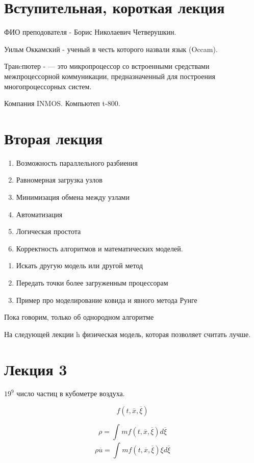 \documentclass{article}
\begin{document}
\section{Вступительная, короткая лекция}

ФИО преподователя -  Борис Николаевич Четверушкин.

Уильм Оккамский - ученый в честь которого назвали язык (Occam).

Транcпютер - — это микропроцессор со встроенными средствами межпроцессорной коммуникации, предназначенный для построения многопроцессорных систем.

Компания INMOS. Компьютеп t-800.

\section{Вторая лекция}

\begin{enumerate}
	\item Возможность параллельного разбиения
	\item Равномерная загрузка узлов
	\item Минимизация обмена между узлами
	\item Автоматизация
	\item Логическая простота
	\item Корректность алгоритмов и математических моделей.
\end{enumerate}

\begin{enumerate}
	\item Искать другую модель или другой метод
	\item Передать точки более загруженным процессорам
	\item Пример про моделирование ковида и явного метода Рунге
\end{enumerate} 

Пока говорим, только об однородном алгоритме

На следующей лекции h физическая модель, которая позволяет считать лучше.

\section{Лекция 3}

$ 19^9 $ число частиц в кубометре воздуха.

\[ f(t, \overline{x}, \overline{\xi }) \]

\[ \rho = \int_{}^{} mf(t, \overline{x}, \overline{\xi }) d \overline{\xi  } \]
\[ \rho \overline{u} = \int_{}^{} mf(t, \overline{x}, \overline{\xi }) \xi    d \overline{\xi  } \]
\end{document}
